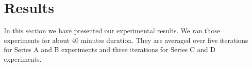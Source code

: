 \documentclass[journal]{IEEEtran}
\begin{document}
\section{Results}
\label{sec:results}
In this section we have presented our experimental results. We ran those experiments for about 40 minutes duration.  They are averaged over five iterations for Series A and B experiments and three iterations for Series C and D experiments. 
\end{document}
